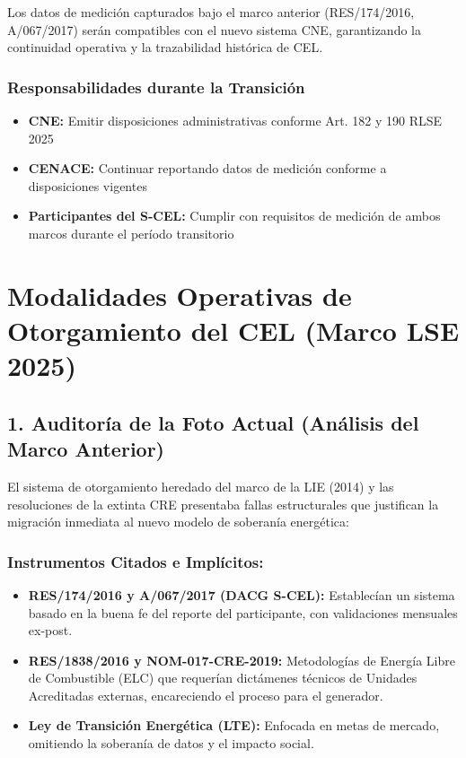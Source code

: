 \documentclass{cel}
\begin{document}
Los datos de medición capturados bajo el marco anterior (RES/174/2016, A/067/2017) serán compatibles con el nuevo sistema CNE, garantizando la continuidad operativa y la trazabilidad histórica de CEL.


\subsubsection{Responsabilidades durante la Transición}
\nopagebreak

\begin{itemize}
\item \textbf{CNE:} Emitir disposiciones administrativas conforme Art. 182 y 190 RLSE 2025
\item \textbf{CENACE:} Continuar reportando datos de medición conforme a disposiciones vigentes
\item \textbf{Participantes del S-CEL:} Cumplir con requisitos de medición de ambos marcos durante el período transitorio



\end{itemize}
\clearpage
{}
{}
\section*{Modalidades Operativas de Otorgamiento del CEL (Marco LSE 2025)}
\nopagebreak


\subsection{1. Auditoría de la \textquotedbl{}Foto Actual\textquotedbl{} (Análisis del Marco Anterior)}
\nopagebreak

El sistema de otorgamiento heredado del marco de la LIE (2014) y las resoluciones de la extinta CRE presentaba fallas estructurales que justifican la migración inmediata al nuevo modelo de soberanía energética:


\subsubsection{Instrumentos Citados e Implícitos:}
\nopagebreak

\begin{itemize}
\item \textbf{RES/174/2016 y A/067/2017 (DACG S-CEL):} Establecían un sistema basado en la \textquotedbl{}buena fe\textquotedbl{} del reporte del participante, con validaciones mensuales ex-post.
\item \textbf{RES/1838/2016 y NOM-017-CRE-2019:} Metodologías de Energía Libre de Combustible (ELC) que requerían dictámenes técnicos de Unidades Acreditadas externas, encareciendo el proceso para el generador.
\item \textbf{Ley de Transición Energética (LTE):} Enfocada en metas de mercado, omitiendo la soberanía de datos y el impacto social.

\end{itemize}
\end{document}
